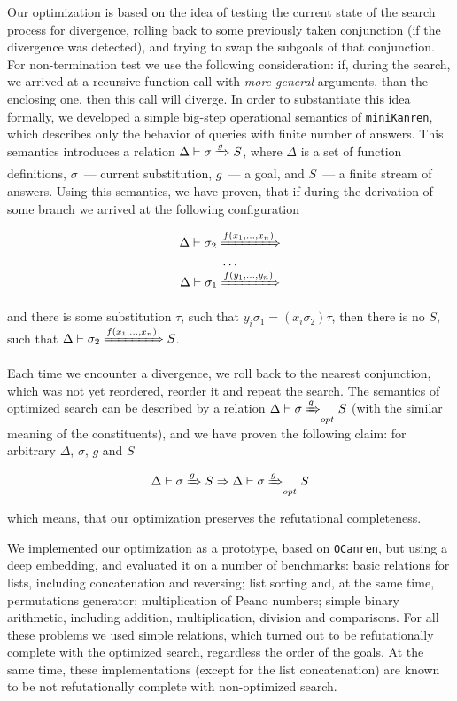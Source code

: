 \documentclass[preprint,numbers,10pt]{sigplanconf}
\newcommand{\miniKanren}{\texttt{miniKanren}\xspace}
\newcommand{\ocanren}{\texttt{OCanren}\xspace}
\begin{document}

Our optimization is based on the idea of testing the current state of the search process for divergence, rolling back to some previously taken conjunction
(if the divergence was detected), and trying to swap the subgoals of that conjunction. For non-termination test we use the following consideration: if, during
the search, we arrived at a recursive function call with \emph{more general} arguments, than the enclosing one, then this call will diverge. In order to substantiate
this idea formally, we developed a simple big-step operational semantics of \miniKanren, which describes only the behavior of queries with finite number of answers.
This semantics introduces a relation $\Delta\vdash\sigma\xRightarrow{g} S$, where $\Delta$ is a set of function definitions, $\sigma$~--- current substitution, 
$g$~--- a goal, and $S$~--- a finite stream of answers. Using this semantics, we have proven, that if during the derivation of some branch we arrived at the 
following configuration

$$
\begin{array}{c}
  \Delta\vdash\sigma_2\xRightarrow{f(x_1,\dots,x_n)}\\
  \ldots\\
  \Delta\vdash\sigma_1\xRightarrow{f(y_1,\dots,y_n)} 
\end{array}
$$

\noindent and there is some substitution $\tau$, such that $y_i\sigma_1=(x_i\sigma_2)\tau$, then there is no $S$, such that $\Delta\vdash\sigma_2\xRightarrow{f(x_1,\dots,x_n)} S$.

Each time we encounter a divergence, we roll back to the nearest conjunction, which was not yet reordered, reorder it and repeat the search. The semantics of optimized search 
can be described by a relation $\Delta\vdash\sigma\xRightarrow{g}_{opt} S$ (with the similar meaning of the constituents), and we have proven the following claim: for arbitrary
$\Delta$, $\sigma$, $g$ and $S$ 

$$\Delta\vdash\sigma\xRightarrow{g}S\Rightarrow\Delta\vdash\sigma\xRightarrow{g}_{opt} S$$

\noindent which means, that our optimization preserves the refutational completeness.

We implemented our optimization as a prototype, based on \ocanren, but using a deep embedding, and evaluated it on a number of benchmarks:
basic relations for lists, including concatenation and reversing; list sorting and, at the same time, permutations generator;
multiplication of Peano numbers; simple binary arithmetic, including addition, multiplication, division and comparisons. 
For all these problems we used simple relations, which turned out to be refutationally complete with the optimized search, regardless the order of the goals. 
At the same time, these implementations (except for the list concatenation) are known to be not refutationally complete with 
non-optimized search.
\end{document}
